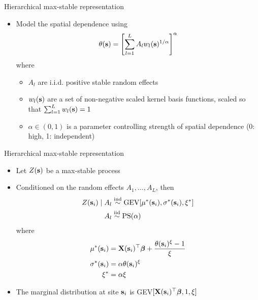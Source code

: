 \documentclass{beamer}
\begin{document}
\begin{frame}{Hierarchical max-stable representation}
	\begin{itemize} \setlength{\itemsep}{1em}
		\item Model the spatial dependence using
		\begin{align*}
		\theta(\mathbf{s}) = \left[\sum_{l = 1}^L A_l w_l(\mathbf{s})^{1 / \alpha}\right]^\alpha
		\end{align*}
		where
		\begin{itemize} \setlength{\itemsep}{0.5em}
			\item $A_l$ are i.i.d. positive stable random effects
			\item $w_l(\mathbf{s})$ are a set of non-negative scaled kernel basis functions, scaled so that $\sum_{l = 1}^L w_l(\mathbf{s}) = 1$
			\item $\alpha \in (0, 1)$ is a parameter controlling strength of spatial dependence (0: high, 1: independent)
		\end{itemize}
	\end{itemize}
\end{frame}

\begin{frame}{Hierarchical max-stable representation}
	\begin{itemize} \setlength{\itemsep}{1em}
		\item Let $Z(\mathbf{s})$ be a max-stable process
		\item Conditioned on the random effects $A_1, \ldots, A_L$, then 
		\begin{align*}
		Z(\mathbf{s}_i) \mid A_l &\stackrel{\mathrm{ind}}{\sim} \text{GEV}[\mu^*(\mathbf{s}_i), \sigma^*(\mathbf{s}_i), \xi^*] \\
		A_l &\stackrel{\mathrm{iid}}{\sim} \text{PS}(\alpha)
		\end{align*}
		where
		\begin{align*}
			\mu^*(\mathbf{s}_i) &= \mathbf{X}(\mathbf{s}_i)^\top \mbox{\boldmath $\beta$} +  \frac{\theta(\mathbf{s}_i)^{\xi} - 1}{\xi}\\
			\sigma^*(\mathbf{s}_i) &= \alpha \theta(\mathbf{s}_i)^{\xi}\\
			\xi^* &= \alpha \xi
		\end{align*}
		\item The marginal distribution at site $\mathbf{s}_i$ is GEV$[\mathbf{X}(\mathbf{s}_i)^\top \mbox{\boldmath $\beta$}, 1, \xi]$
	\end{itemize}
\end{frame}
\end{document}
